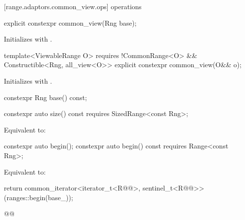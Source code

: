 [range.adaptors.common_view.ops]{ operations}

%
\begin{itemdecl}
explicit constexpr common_view(Rng base);
\end{itemdecl}

\begin{itemdescr}
\pnum
\effects Initializes  with .
\end{itemdescr}

%
\begin{itemdecl}
template<ViewableRange O>
  requires !CommonRange<O> && Constructible<Rng, all_view<O>>
explicit constexpr common_view(O&& o);
\end{itemdecl}

\begin{itemdescr}
\pnum
\effects Initializes  with .
\end{itemdescr}

%
\begin{itemdecl}
constexpr Rng base() const;
\end{itemdecl}

\begin{itemdescr}
\pnum
\oldtxt{\returns}  
\end{itemdescr}

%
\begin{itemdecl}
constexpr auto size() const requires SizedRange<const Rng>;
\end{itemdecl}

\begin{itemdescr}
\pnum
\effects Equivalent to: 
\end{itemdescr}

%
\begin{itemdecl}
constexpr auto begin();
constexpr auto begin() const requires Range<const Rng>;
\end{itemdecl}

\begin{itemdescr}
\pnum
{}

\pnum
\effects Equivalent to:
\begin{codeblock}
return common_iterator<iterator_t<R@@>, sentinel_t<R@@>>(ranges::begin(base_));
\end{codeblock}
\begin{codeblock}
@@
\end{codeblock}
\end{itemdescr}

